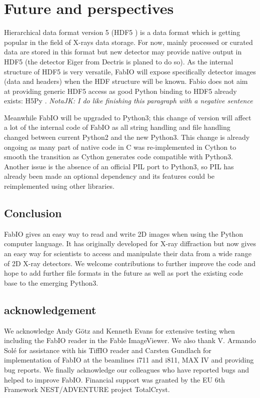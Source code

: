 \documentclass{iucr}
\begin{document}
\section{Future and perspectives}

Hierarchical data format version 5 (HDF5 \cite{hdf5}) is a data format which is
getting popular in the field of X-rays data storage. For now, mainly processed
or curated data are stored in this format but new detector may provide native
output in HDF5 (the detector Eiger from Dectris is planed to do so). As the
internal structure of HDF5 is very versatile, FabIO will expose specifically
detector images (data and headers) when the HDF structure will be known.
Fabio does not aim at providing generic HDF5 access as good
Python binding to HDF5 already exists: H5Py \cite{h5py}. 
{\em NotaJK: I do like finishing this paragraph with a negative sentence} 

Meanwhile FabIO will be upgraded to Python3; this change of version will affect
a lot of the internal code of FabIO as all string handling and file handling
changed between current Python2 and the new Python3. This change is already
ongoing as many part of native code in C was re-implemented in
Cython \cite{cython} to smooth the transition as Cython generates code 
compatible with Python3. Another issue is the absence of an official PIL port to
Python3, so PIL has already been made an optional dependency and its features could be
reimplemented using other libraries. 

\subsection{Conclusion}

FabIO gives an easy way to read and write 2D images when using the
Python computer language.
It has originally developed for X-ray diffraction but now gives
an easy way for scientists to access and manipulate
their data from a wide range of 2D X-ray detectors.
We welcome contributions to further improve the code and hope to add
further file formats in the future as well as port the existing code base 
to the emerging Python3.


\subsection{acknowledgement}
We acknowledge Andy G\"otz and Kenneth Evans for extensive testing when including
the FabIO reader in the Fable ImageViewer.
We also thank V. Armando Sol\'e for assistance with his TiffIO reader and
Carsten Gundlach for implementation of FabIO at the beamlines i711 and i811, MAX IV and providing bug reports.
We finally acknowledge our colleagues who have reported bugs and helped to
improve FabIO.
Financial support was granted by the EU 6th Framework NEST/ADVENTURE project
TotalCryst.
\end{document}
